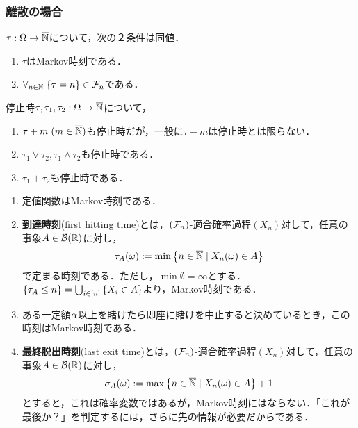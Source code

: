\documentclass[uplatex,dvipdfmx]{jsreport}
\begin{document}
\subsubsection{離散の場合}

\begin{lemma}[離散の場合の特徴付け]
    $\tau:\Omega\to\overline{\mathbb{N}}$について，次の２条件は同値．
    \begin{enumerate}
        \item $\tau$はMarkov時刻である．
        \item $\forall_{n\in\mathbb{N}}\;\{\tau=n\}\in\mathcal{F}_n$である．
    \end{enumerate}
\end{lemma}

\begin{lemma}[離散停止時の構成]
    停止時$\tau,\tau_1,\tau_2:\Omega\to\overline{\mathbb{N}}$について，
    \begin{enumerate}
        \item $\tau+m\;(m\in\overline{\mathbb{N}})$も停止時だが，一般に$\tau-m$は停止時とは限らない．
        \item $\tau_1\lor\tau_2,\tau_1\land\tau_2$も停止時である．
        \item $\tau_1+\tau_2$も停止時である．
    \end{enumerate}
\end{lemma}


\begin{example}[離散の例]\label{exp-discrete-Markov-time}\mbox{}
    \begin{enumerate}
        \item 定値関数はMarkov時刻である．
        \item \textbf{到達時刻}(first hitting time)とは，$(\mathcal{F}_n)$-適合確率過程$(X_n)$対して，任意の事象$A\in\mathcal{B}(\mathbb{R})$に対し，
        \[\tau_A(\omega):=\min\left\{n\in\overline{\mathbb{N}}\mid X_n(\omega)\in A\right\}\]
        で定まる時刻である．ただし，$\min\emptyset=\infty$とする．
        $\{\tau_A\le n\}=\bigcup_{i\in[n]}\left\{X_i\in A\right\}$より，Markov時刻である．
        \item ある一定額$\alpha$以上を賭けたら即座に賭けを中止すると決めているとき，この時刻はMarkov時刻である．
        \item \textbf{最終脱出時刻}(last exit time)とは，$(\mathcal{F}_n)$-適合確率過程$(X_n)$対して，任意の事象$A\in\mathcal{B}(\mathbb{R})$に対し，
        \[\sigma_A(\omega):=\max\left\{n\in\overline{\mathbb{N}}\mid X_n(\omega)\in A\right\}+1\]
        とすると，これは確率変数ではあるが，Markov時刻にはならない．「これが最後か？」を判定するには，さらに先の情報が必要だからである．
    \end{enumerate}
\end{example}
\end{document}
